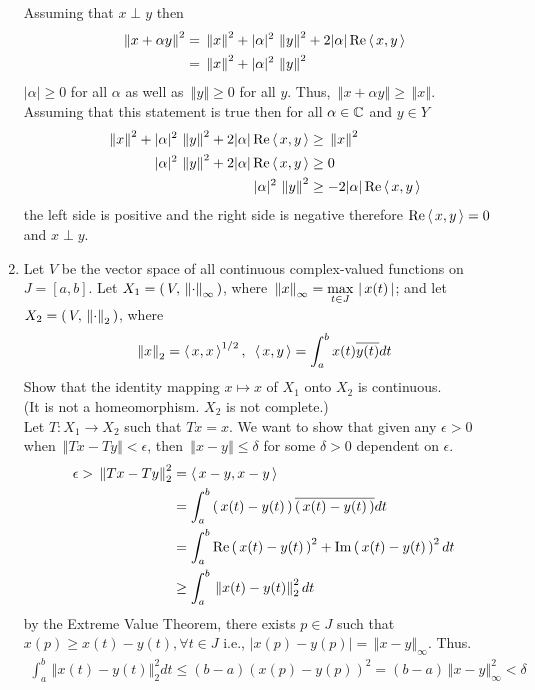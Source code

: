 \documentclass[10pt,a4paper]{report}
\newcommand{\NORM}[1]{\,\left \Vert #1 \right \Vert}
\begin{document}
\begin{enumerate}
	Assuming that $x \perp y$ then
	\begin{align*}
		\NORM{x+\alpha y}^2 &= \NORM{x}^2 + |\alpha|^2\NORM{y}^2 +2|\alpha|\RR\ABRACKET{x,y} \\
		&= \NORM{x}^2 + |\alpha|^2\NORM{y}^2
	\end{align*}$|\alpha| \ge 0$ for all $\alpha$ as well as $\NORM{y} \ge 0$ for all $y$.  Thus, $\NORM{x+\alpha y}\ge \NORM{x}$.\\
	Assuming that this statement is true then for all $\alpha \in \mathbb{C}$ and $y \in Y$
	\begin{align*}
		\NORM{x}^2 + |\alpha|^2\NORM{y}^2 +2|\alpha|\RR\ABRACKET{x,y} &\ge \NORM{x}^2 \\
		|\alpha|^2\NORM{y}^2 +2|\alpha|\RR\ABRACKET{x,y} &\ge 0 \\
		|\alpha|^2\NORM{y}^2 &\ge -2|\alpha|\RR\ABRACKET{x,y}
	\end{align*}the left side is positive and the right side is negative therefore $\operatorname{Re}\left \langle\, x,y \,\right \rangle=0$ and $x \perp y$.
	
	\newpage
	\item Let $V$ be the vector space of all continuous complex-valued functions on $J=[a,b]$.  Let $X_1 = \PAREN{V, \NORM{\cdot}_\infty}$, where $\NORM{x}_\infty = \MAX{t\in J}\BARS{x(t)}$; and let $X_2 = \PAREN{V, \NORM{\cdot}_2}$, where
	\begin{align*}
		\NORM{x}_2 = \ABRACKET{x,x}^{1/2}, \text{     } \ABRACKET{x,y} = \int_a^b x(t)\CONJ{y(t)} dt
	\end{align*}  Show that the identity mapping $x \mapsto x$ of $X_1$ onto $X_2$ is continuous.\\(It is not a homeomorphism.  $X_2$ is not complete.)\\
	
	Let $T: X_1 \to X_2$ such that $Tx=x$.  We want to show that given any $\epsilon > 0$ when $\NORM{Tx - Ty} < \epsilon$, then $\NORM{x-y} \le \delta$ for some $\delta>0$ dependent on $\epsilon$.
	\begin{align*}
		\epsilon > \NORM{Tx - Ty}_2^2 &= \ABRACKET{x-y, x-y} \\
		&= \int_a^b \PAREN{x(t)-y(t)}\CONJ{\PAREN{x(t)-y(t)}}dt \\
		&= \int_a^b \RR\PAREN{x(t)-y(t)}^2 + \IM\PAREN{x(t)-y(t)}^2 dt \\
		&\ge \int_a^b \NORM{x(t)-y(t)}_2^2 dt
	\end{align*}by the Extreme Value Theorem, there exists $p \in J$ such that $x(p) \ge x(t)-y(t),\forall t\in J$ i.e., $|x(p)-y(p)| = \NORM{x-y}_\infty$.  Thus.
	\begin{align*}
		\int_a^b \NORM{x(t)-y(t)}_2^2 dt \le (b-a) (x(p)-y(p))^2 = (b-a)\NORM{x-y}_\infty^2 < \delta
	\end{align*}
	

\end{enumerate}
\end{document}

